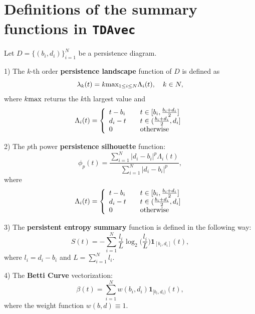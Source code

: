 \documentclass[conference, onecolumn]{IEEEtran}
\begin{document}






\appendix
\section{Definitions of the summary functions in \texttt{TDAvec}}

Let $D=\{(b_i,d_i)\}_{i=1}^N$ be a persistence diagram. 

1) The $k$-th order \textbf{persistence landscape} function of $D$ is defined as $$\lambda_k(t) = k\hbox{max}_{1\leq i \leq N} \Lambda_i(t), \quad k\in N,$$
where $k\hbox{max}$ returns the $k$th largest value and 
$$\Lambda_i(t) = \left\{
        \begin{array}{ll}
            t-b_i & \quad t\in [b_i,\frac{b_i+d_i}{2}] \\
            d_i-t & \quad t\in (\frac{b_i+d_i}{2},d_i]\\
            0 & \quad \hbox{otherwise}
        \end{array}
    \right.$$

2) The $p$th power \textbf{persistence silhouette} function:
$$\phi_p(t) = \frac{\sum_{i=1}^N |d_i-b_i|^p\Lambda_i(t)}{\sum_{i=1}^N |d_i-b_i|^p},$$
where
$$\Lambda_i(t) = \left\{
        \begin{array}{ll}
            t-b_i & \quad t\in [b_i,\frac{b_i+d_i}{2}] \\
            d_i-t & \quad t\in (\frac{b_i+d_i}{2},d_i]\\
            0 & \quad \hbox{otherwise}
        \end{array}
    \right.$$

3) The \textbf{persistent entropy summary} function is defined in the following way:
$$
S(t)=-\sum_{i=1}^N \frac{l_i}{L}\log_2{(\frac{l_i}{L}})\mathbf 1_{[b_i,d_i]}(t),
$$ where $l_i=d_i-b_i$ and $L=\sum_{i=1}^Nl_i$.

4) The \textbf{Betti Curve} vectorization: 
$$
\beta(t)=\sum_{i=1}^N w(b_i,d_i)\mathbf 1_{[b_i,d_i)}(t),
$$ where the weight function $w(b,d)\equiv 1$.
\end{document}
